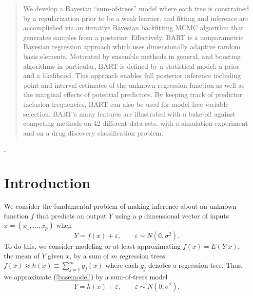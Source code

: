 \documentclass[aoas,nameyear,dvips]{arximspdf}
\let\epsilon\varepsilon
\begin{document}
\begin{frontmatter}
\begin{abstract}
We develop a Bayesian ``sum-of-trees'' model where each
tree is constrained by a regularization prior to be a weak learner,
and fitting and inference are accomplished via an iterative Bayesian
backfitting MCMC algorithm that generates samples from a posterior.
Effectively, BART is a nonparametric Bayesian regression approach
which uses dimensionally adaptive random basis elements.  Motivated by ensemble methods
in general, and boosting algorithms in particular,  BART is defined by a
statistical model: a prior and a likelihood.  This approach enables full posterior inference
including point and interval estimates of the unknown regression function as
well as the marginal effects of potential predictors.  By keeping track of predictor
inclusion frequencies, BART can also be used for model-free variable selection.
BART's many features are illustrated with a bake-off against competing methods
on 42 different data sets, with a simulation experiment and on a
drug discovery classification problem.
\end{abstract}

\begin{keyword}
.
\end{keyword}


\end{frontmatter}

\section{Introduction}\label{sec:intro}


We consider the fundamental problem of making inference about an
unknown function $f$ that predicts an output $Y$ using a $p$
dimensional vector of inputs $x = (x_1,\dots,x_p)$ when
\begin{equation}
Y=f(x) + \epsilon, \qquad  \epsilon \sim N(0,\sigma^2).
\label{basemodel}
\end{equation}
To do this, we consider modeling or at least approximating $f(x)
= E(Y | x)$, the mean of $Y$ given $x$, by a sum of $m$
regression trees $f(x) \approx h(x) \equiv \sum_{j=1}^m g_j(x)$
where each $g_j$ denotes a regression tree.  Thus, we approximate
(\ref{basemodel}) by a sum-of-trees model
\begin{equation}
Y = h(x) + \epsilon, \qquad  \epsilon
\sim N(0,\sigma^2). \label{sstmodel1}
\end{equation}
\end{document}
